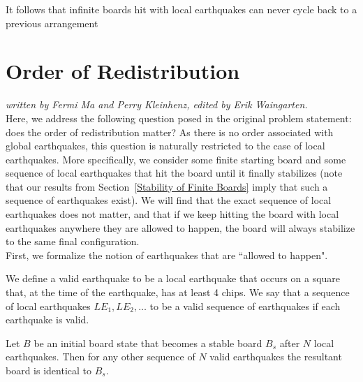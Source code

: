 \documentclass[runningheads,a4paper]{llncs}
\begin{document}
It follows that infinite boards hit with local earthquakes can never cycle back to a previous arrangement

\section{Order of Redistribution}
\label{Order of Redistribution}

\emph{written by Fermi Ma and Perry Kleinhenz, edited by Erik Waingarten.}\\

Here, we address the following question posed in the original problem statement: does the order of redistribution matter? As there is no order associated with global earthquakes, this question is naturally restricted to the case of local earthquakes. More specifically, we consider some finite starting board and some sequence of local earthquakes that hit the board until it finally stabilizes (note that our results from Section~\ref{Stability of Finite Boards} imply that such a sequence of earthquakes exist). We will find that the exact sequence of local earthquakes does not matter, and that if we keep hitting the board with local earthquakes anywhere they are allowed to happen, the board will always stabilize to the same final configuration.\\

First, we formalize the notion of earthquakes that are ``allowed to happen".

\begin{definition}
We define a valid earthquake to be a local earthquake that occurs on a square that, at the time of the earthquake, has at least 4 chips. We say that a sequence of local earthquakes $LE_1, LE_2, \ldots$ to be a valid sequence of earthquakes if each earthquake is valid.
\end{definition}

\begin{theorem}
Let $B$ be an initial board state that becomes a stable board $B_s$ after $N$ local earthquakes. Then for any other sequence of $N$ valid earthquakes the resultant board is identical to $B_s$.
\end{theorem}
\end{document}
